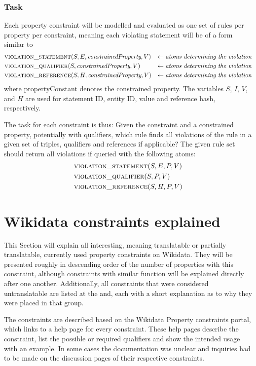 \documentclass[hyperref,bachelorofscience,fleqn]{cgvpub}
\begin{document}
\subsection{Task}\label{subsec_task}
Each property constraint will be modelled and evaluated as one set of rules per property per constraint, meaning each violating statement will be of a form similar to
\begin{align*}
&\textsc{violation\_statement}(S, E, \emph{constrainedProperty}, V) &\leftarrow \emph{atoms determining the violation} \\
&\textsc{violation\_qualifier}(S, \emph{constrainedProperty}, V) &\leftarrow \emph{atoms determining the violation} \\
&\textsc{violation\_reference}(S, H, \emph{constrainedProperty}, V) &\leftarrow \emph{atoms determining the violation}
\end{align*}
where propertyConstant denotes the constrained property. The variables \(S\), \(I\), \(V\), and \(H\) are used for statement ID, entity ID, value and reference hash, respectively.

The task for each constraint is thus: Given the constraint and a constrained property, potentially with qualifiers, which rule finds all violations of the rule in a given set of triples, qualifiers and references if applicable? The given rule set should return all violations if queried with the following atoms:
\begin{align*}
&\textsc{violation\_statement}(S, E, P, V) \\
&\textsc{violation\_qualifier}(S, P, V) \\
&\textsc{violation\_reference}(S, H, P, V)
\end{align*}

\chapter{Wikidata constraints explained}\label{cha_wikidata_constraints_explained}
This Section will explain all interesting, meaning translatable or partially translatable, currently used property constraints on Wikidata. They will be presented roughly in descending order of the number of properties with this constraint, although constraints with similar function will be explained directly after one another. Additionally, all constraints that were considered untranslatable are listed at the and, each with a short explanation as to why they were placed in that group.

The constraints are described based on the Wikidata Property constraints portal\cite{constraintsPortal}, which links to a help page for every constraint. These help pages describe the constraint, list the possible or required qualifiers and show the intended usage with an example. In some cases the documentation was unclear and inquiries had to be made on the discussion pages of their respective constraints.
\end{document}
